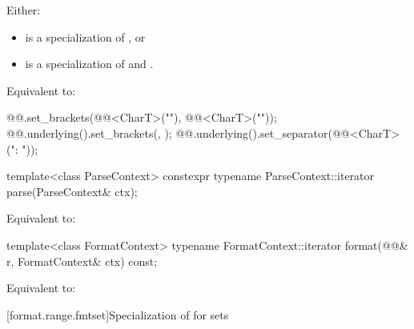 \begin{itemdescr}
\pnum
\mandates
Either:
\begin{itemize}
\item
{} is a specialization of , or
\item
{} is a specialization of  and
.
\end{itemize}

\pnum
\effects
Equivalent to:
\begin{codeblock}
@@.set_brackets(@@<CharT>("{"), @@<CharT>("}"));
@@.underlying().set_brackets({}, {});
@@.underlying().set_separator(@@<CharT>(": "));
\end{codeblock}
\end{itemdescr}

%
\begin{itemdecl}
template<class ParseContext>
  constexpr typename ParseContext::iterator
    parse(ParseContext& ctx);
\end{itemdecl}

\begin{itemdescr}
\pnum
\effects
Equivalent to: 
\end{itemdescr}

%
\begin{itemdecl}
template<class FormatContext>
  typename FormatContext::iterator
    format(@@& r, FormatContext& ctx) const;
\end{itemdecl}

\begin{itemdescr}
\pnum
\effects
Equivalent to: 
\end{itemdescr}

[format.range.fmtset]{Specialization of  for sets}

